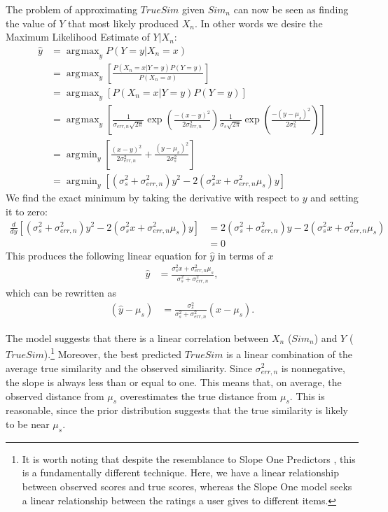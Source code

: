 \documentclass[11pt]{article}
\DeclareMathOperator*{\argmax}{arg\!\max}
\DeclareMathOperator*{\argmin}{arg\!\min}
\begin{document}
The problem of approximating $TrueSim$ given $Sim_n$ can now be seen as finding
the value of $Y$ that most likely produced $X_n$. In other words we desire the
Maximum Likelihood Estimate of $Y | X_n$:
\begin{align}
\hat{y} &= \argmax_yP(Y=y|X_n=x) 
\\&= \argmax_y\left[\frac{P(X_n=x | Y=y)P(Y=y)}{P(X_n=x)}\right]
\\&= \argmax_y\left[P(X_n=x|Y=y)P(Y=y)\right]
\\&= 
\argmax_y\left[\frac{1}{\sigma_{err,n}\sqrt{2\pi}}\exp{\left(\frac{-(x-y)^2}
{2\sigma_{err,n}^2}\right)}
\frac{1}{\sigma_{s}\sqrt{2\pi}}\exp{\left(\frac{-(y-\mu_s)^2}
{2\sigma_{s}^2}\right)}\right]
\\&= \argmin_y\left[\frac{(x-y)^2}{2\sigma_{err,n}^2} +
\frac{(y-\mu_s)^2}{2\sigma_{s}^2}\right]
\\&= \argmin_y\left[\left(\sigma_{s}^2+\sigma_{err,n}^2\right)y^2 - 
2\left(\sigma_{s}^2x+\sigma_{err,n}^2\mu_s\right)y\right]
\end{align}
We find the exact minimum by taking the derivative with respect to $y$ and
setting it to zero:
\begin{align}
\frac{d}{dy}\left[\left(\sigma_{s}^2+\sigma_{err,n}^2\right)y^2 - 
2\left(\sigma_{s}^2x+\sigma_{err,n}^2\mu_s\right)y\right]
&= 2\left(\sigma_{s}^2+\sigma_{err,n}^2\right)y - 
2\left(\sigma_{s}^2x+\sigma_{err,n}^2\mu_s\right) 
\\&= 0
\end{align}
This produces the following linear equation for $\hat{y}$ in terms of $x$
\begin{align}
\hat{y} &=
\frac{\sigma_{s}^2x+\sigma_{err,n}^2\mu_s}{\sigma_{s}^2+\sigma_{err,n}^2},
\end{align}
which can be rewritten as
\begin{align}
\left(\hat{y} - \mu_s\right) &= \frac{\sigma_{s}^2}{\sigma_{s}^2+\sigma_{err,n}^2}
\left(x-\mu_s\right).
\end{align}

The model suggests that there is a linear correlation between $X_n$ ($Sim_n$)
and $Y$ ($TrueSim$).\footnote{It is worth noting that despite the resemblance to
Slope One Predictors \cite{Lemire1998}, this is a fundamentally different
technique. Here, we have a linear relationship between observed scores and true
scores, whereas the Slope One model seeks a linear relationship between the
ratings a user gives to different items.} Moreover, the best predicted $TrueSim$
is a linear combination of the average true similarity and the observed
similiarity. Since $\sigma_{err,n}^2$ is nonnegative, the slope is always less
than or equal to one. This means that, on average, the observed distance from $\mu_s$
overestimates the true distance from $\mu_s$. This is reasonable, since the prior
distribution suggests that the true similarity is likely to be near $\mu_s$.
\end{document}
